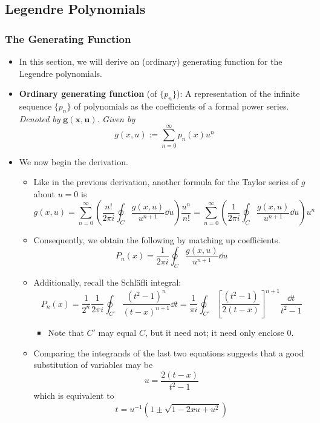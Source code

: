 \documentclass[../finalProject.tex]{subfiles}
\begin{document}
\setcounter{subsection}{3}
\subsection{Legendre Polynomials}
\subsubsection{The Generating Function}
\begin{itemize}
    \item In this section, we will derive an (ordinary) generating function for the Legendre polynomials.
    \item \textbf{Ordinary generating function} (of $\{p_n\}$): A representation of the infinite sequence $\{p_n\}$ of polynomials as the coefficients of a formal power series. \emph{Denoted by} $\bm{g(x,u)}$. \emph{Given by}
    \begin{equation*}
        g(x,u) := \sum_{n=0}^\infty p_n(x)u^n
    \end{equation*}
    \item We now begin the derivation.
    \begin{itemize}
        \item Like in the previous derivation, another formula for the Taylor series of $g$ about $u=0$ is
        \begin{equation*}
            g(x,u) = \sum_{n=0}^\infty\left( \frac{n!}{2\pi i}\oint_C\frac{g(x,u)}{u^{n+1}}\dd{u} \right)\frac{u^n}{n!}
            = \sum_{n=0}^\infty\left( \frac{1}{2\pi i}\oint_C\frac{g(x,u)}{u^{n+1}}\dd{u} \right)u^n
        \end{equation*}
        \item Consequently, we obtain the following by matching up coefficients.
        \begin{equation*}
            P_n(x) = \frac{1}{2\pi i}\oint_C\frac{g(x,u)}{u^{n+1}}\dd{u}
        \end{equation*}
        \item Additionally, recall the Schl\"{a}fli integral:
        \begin{equation*}
            P_n(x) = \frac{1}{2^n}\frac{1}{2\pi i}\oint_{C'}\frac{(t^2-1)^n}{(t-x)^{n+1}}\dd{t}
            = \frac{1}{\pi i}\oint_{C'}\left[ \frac{(t^2-1)}{2(t-x)} \right]^{n+1}\frac{\dd{t}}{t^2-1}
        \end{equation*}
        \begin{itemize}
            \item Note that $C'$ may equal $C$, but it need not; it need only enclose 0.
        \end{itemize}
        \item Comparing the integrands of the last two equations suggests that a good substitution of variables may be
        \begin{equation*}
            u = \frac{2(t-x)}{t^2-1}
        \end{equation*}
        which is equivalent to
        \begin{equation*}
            t = u^{-1}(1\pm\sqrt{1-2xu+u^2})
        \end{equation*}
    \end{itemize}
\end{itemize}
\end{document}

